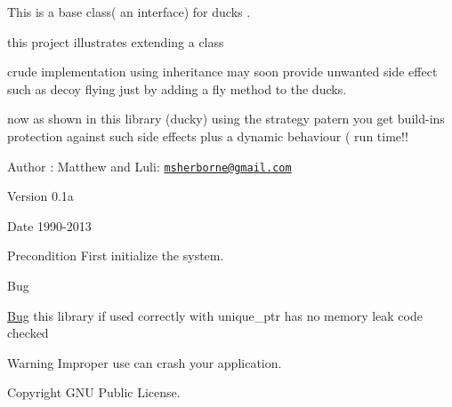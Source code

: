This is a base class( an interface) for ducks .\par
 this project illustrates extending a class \par
 crude implementation using inheritance may soon provide unwanted side effect such as decoy flying just by adding a fly method to the ducks.\par
 now as shown in this library (ducky) using the strategy patern you get build-\/ins protection against such side effects plus a dynamic behaviour ( run time!! \begin{DoxyAuthor}{Author}
\-: Matthew and Luli\-: \href{mailto:msherborne@gmail.com}{\tt msherborne@gmail.\-com} 
\end{DoxyAuthor}
\begin{DoxyVersion}{Version}
0.\-1a 
\end{DoxyVersion}
\begin{DoxyDate}{Date}
1990-\/2013 
\end{DoxyDate}
\begin{DoxyPrecond}{Precondition}
First initialize the system. 
\end{DoxyPrecond}
\begin{DoxyRefDesc}{Bug}
\item[\hyperlink{bug__bug000005}{Bug}]this library if used correctly with unique\-\_\-ptr has no memory leak code checked \end{DoxyRefDesc}
\begin{DoxyWarning}{Warning}
Improper use can crash your application. 
\end{DoxyWarning}
\begin{DoxyCopyright}{Copyright}
G\-N\-U Public License. \par
 
\end{DoxyCopyright}


